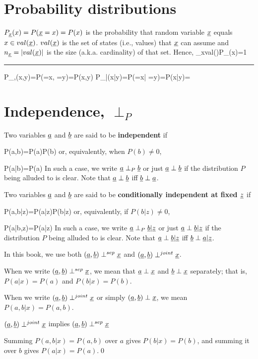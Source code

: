 \section{Probability distributions}
 $P_\rvx(x)=P(\rvx=x)=P(x)$ is the probability that random variable $\rvx$ equals $x\in val(\rvx)$. $val(\rvx)$ is the set of states (i.e., values) that $\rvx$ can assume and $n_\rvx = |val(\rvx)|$ is the size (a.k.a. cardinality) of that set. Hence,
\beq
\sum_{x\in val(\rvx)}P_\rvx(x)=1
\eeq

\hrule
\beq
P_{\rvx,\rvy}(x,y)=P(\rvx=x, \rvy=y)=P(x,y)
\eeq
\beq
P_{\rvx|\rvy}(x|y)=P(\rvx=x| \rvy=y)=P(x|y)=
\eeq

\section{Independence, $\perp_P$}
\label{sec-perp-p}

Two variables $\rva$ and $\rvb$
are said to be {\bf independent} if

\beq
P(a,b)=P(a)P(b)
\eeq
or,
equivalently, when $P(b)\neq 0$,

\beq
P(a|b)=P(a)
\eeq
In such a case, we write $\rva\perp_P \rvb$
or just $\rva\perp \rvb$ if
the distribution $P$
being alluded to is clear.
Note that
$\rva\perp \rvb$ iff
$\rvb\perp \rva$.


Two variables $\rva$ and $\rvb$ are
said to be {\bf conditionally independent at fixed $\rvz$} if

\beq
P(a,b|z)=P(a|z)P(b|z)\eeq
or, equivalently, if $P(b|z)\neq 0$,

\beq
P(a|b,z)=P(a|z)
\eeq
In such a case, we write $\rva\perp_P \rvb|\rvz$
or just $\rva\perp \rvb|\rvz$ if
the distribution $P$
being alluded to is clear.
Note that
$\rva\perp \rvb|\rvz$ iff
$\rvb\perp \rva|\rvz$.


In
this book, we use both
$(\rva, \rvb)\perp^{sep} \rvx$
and $(\rva, \rvb)\perp^{joint} \rvx$.

When we write $(\rva, \rvb)\perp^{sep} \rvx$,
we mean that
$\rva\perp \rvx$
and $\rvb\perp\rvx$ separately; that is,
$P(a|x)=P(a)$
and $P(b|x)=P(b)$.

When we write
$(\rva, \rvb)\perp^{joint} \rvx$
or simply $(\rva, \rvb)\perp \rvx$,
we mean $P(a,b|x)=P(a,b)$.

\begin{claim}
$(\rva, \rvb)\perp^{joint} \rvx$
implies
$(\rva, \rvb)\perp^{sep} \rvx$
\end{claim}
\proof
Summing
$P(a,b|x)=P(a,b)$
over $a$ gives
$P(b|x)=P(b)$,
and summing it
over $b$ gives
$P(a|x)=P(a)$.\qed

